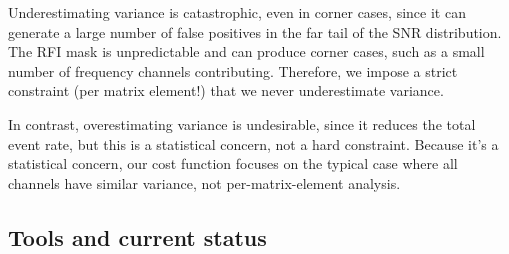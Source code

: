 \documentclass{article}
\numberwithin{equation}{section}   %
\begin{document}
Underestimating variance is catastrophic, even in corner cases, since it can generate
a large number of false positives in the far tail of the SNR distribution.
The RFI mask is unpredictable and can produce corner cases, such as a small number
of frequency channels contributing.
Therefore, we impose a strict constraint (per matrix element!) that we never underestimate
variance.

In contrast, overestimating variance is undesirable, since it reduces the total event rate,
but this is a statistical concern, not a hard constraint.
Because it's a statistical concern, our cost function focuses on the typical case where
all channels have similar variance, not per-matrix-element analysis.

\subsection{Tools and current status}
\end{document}
